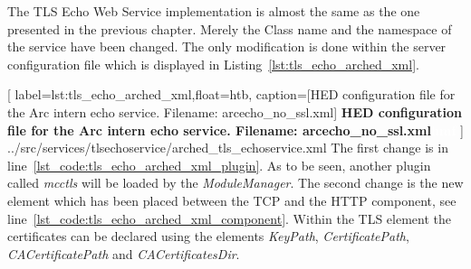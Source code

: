 The TLS Echo Web Service implementation is almost the same as the one presented in the previous chapter. Merely the Class name and the namespace of the service have been changed. The only modification is done within the server configuration file which is displayed in Listing~\ref{lst:tls_echo_arched_xml}.

	[
	label=lst:tls_echo_arched_xml,float=htb,
	caption={[HED configuration file for the Arc intern echo service. Filename: arcecho\_no\_ssl.xml]
	\textbf{HED configuration file for the Arc intern echo service. Filename: arcecho\_no\_ssl.xml\textcolor{white}{hmf}}}
	]
{../src/services/tlsechoservice/arched_tls_echoservice.xml}
The first change is in line~\ref{lst_code:tls_echo_arched_xml_plugin}. As to be seen, another plugin called \textit{mcctls} will be loaded by the \textit{ModuleManager}. The second change is the new element which has been placed between the TCP and the HTTP component, see line~\ref{lst_code:tls_echo_arched_xml_component}. Within the TLS element the certificates can be declared using the elements \textit{KeyPath}, \textit{CertificatePath}, \textit{CACertificatePath} and \textit{CACertificatesDir}.
% 
% 
% 


%
%
%
%
% 


